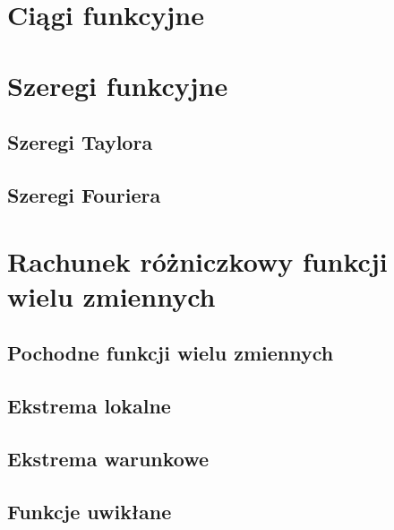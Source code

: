 \documentclass[11pt]{scrartcl}
\begin{document}
    \section{Ciągi funkcyjne}
    

    \section{Szeregi funkcyjne}
    
        \subsection{Szeregi Taylora}
        
        \subsection{Szeregi Fouriera}
        


    \section{Rachunek różniczkowy funkcji wielu zmiennych}
    
        \subsection{Pochodne funkcji wielu zmiennych}
        
        \subsection{Ekstrema lokalne}
        
        \subsection{Ekstrema warunkowe}
        
        \subsection{Funkcje uwikłane}
        
\end{document}
